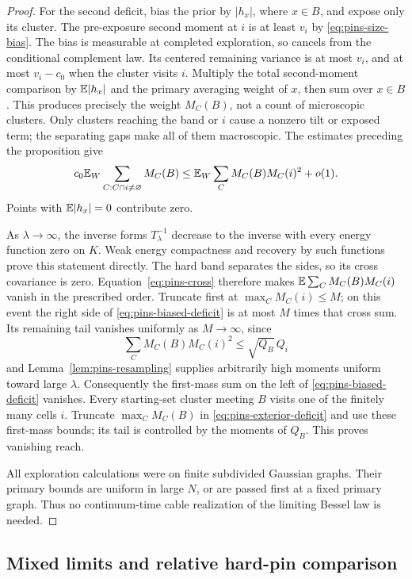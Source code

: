 \begin{proof}
For the second deficit, bias the prior by \(|h_x|\),
where \(x\in B\), and expose only its cluster.
The pre-exposure second moment at \(i\) is at least
\(v_i\) by \eqref{eq:pins-size-bias}. The bias is measurable
at completed exploration, so cancels from the conditional
complement law. Its centered remaining variance is at
most \(v_i\), and at most \(v_i-c_0\) when the cluster
visits \(i\). Multiply the total second-moment comparison
by \(\mathbb E|h_x|\) and the primary averaging weight of \(x\),
then sum over \(x\in B\). This produces precisely the
weight \(M_C(B)\), not a count of microscopic clusters.
Only clusters reaching the band or \(i\) cause a
nonzero tilt or exposed term; the separating gaps make
all of them macroscopic. The estimates preceding the
proposition give
\begin{equation}
 c_0\mathbb E_W\sum_{C:C\cap i\ne\varnothing}M_C(B)
 \le\mathbb E_W\sum_C M_C(B)M_C(i)^2+o(1).
 \label{eq:pins-biased-deficit}
\end{equation}
Points with \(\mathbb E|h_x|=0\) contribute zero.

As \(\lambda\to\infty\), the inverse forms
\(T_\lambda^{-1}\) decrease to the inverse with every
energy function zero on \(K\). Weak energy compactness
and recovery by such functions prove this statement
directly. The hard band separates the sides, so its
cross covariance is zero. Equation~\eqref{eq:pins-cross}
therefore makes
\(\mathbb E\sum_CM_C(B)M_C(i)\) vanish in the prescribed order.
Truncate first at \(\max_CM_C(i)\le M\); on this event
the right side of \eqref{eq:pins-biased-deficit} is at
most \(M\) times that cross sum. Its remaining tail
vanishes uniformly as \(M\to\infty\), since
\[
             \sum_CM_C(B)M_C(i)^2\le\sqrt{Q_B}\,Q_i
\]
and Lemma~\ref{lem:pins-resampling} supplies arbitrarily
high moments uniform toward large \(\lambda\).
Consequently the first-mass sum on the left of
\eqref{eq:pins-biased-deficit} vanishes.
Every starting-set cluster meeting \(B\) visits one
of the finitely many cells \(i\). Truncate
\(\max_CM_C(B)\) in \eqref{eq:pins-exterior-deficit}
and use these first-mass bounds; its tail is controlled
by the moments of \(Q_B\). This proves vanishing reach.

All exploration calculations were on finite subdivided
Gaussian graphs. Their primary bounds are uniform in
large \(N\), or are passed first at a fixed primary
graph. Thus no continuum-time cable realization of the
limiting Bessel law is needed.
\end{proof}

\subsection{Mixed limits and relative hard-pin comparison}

